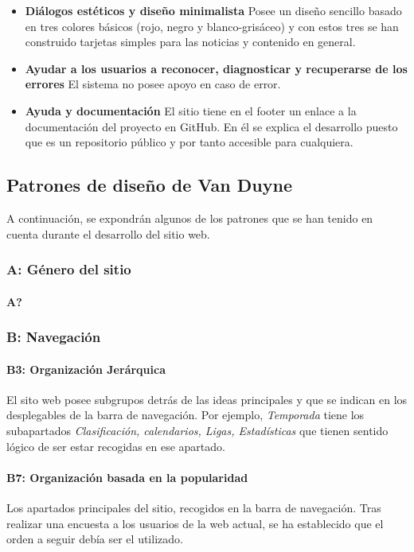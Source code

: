 \documentclass[10pt, spanish, pdftex]{template/UC3M_document}
\begin{document}
\begin{itemize}
    \item \textbf{Diálogos estéticos y diseño minimalista}
    Posee un diseño sencillo basado en tres colores básicos (rojo, negro y blanco-grisáceo) y con estos tres se han construido tarjetas simples para las noticias y contenido en general.

    \item \textbf{Ayudar a los usuarios a reconocer, diagnosticar y recuperarse de los errores}
    El sistema no posee apoyo en caso de error.

    \item \textbf{Ayuda y documentación}
    El sitio tiene en el footer un enlace a la documentación del proyecto en GitHub. En él se explica el desarrollo puesto que es un repositorio público y por tanto accesible para cualquiera.
  \end{itemize}


\subsection{Patrones de diseño de Van Duyne}
A continuación, se expondrán algunos de los patrones que se han tenido en cuenta durante el desarrollo del sitio web.
\subsubsection{A: Género del sitio}
\paragraph{A?}

\subsubsection{B: Navegación}
\paragraph{B3: Organización Jerárquica}
  El sito web posee subgrupos detrás de las ideas principales y que se indican en los desplegables de la barra de navegación. Por ejemplo, \textit{Temporada} tiene los subapartados \textit{Clasificación, calendarios, Ligas, Estadísticas} que tienen sentido lógico de ser estar recogidas en ese apartado.
\paragraph{B7: Organización basada en la popularidad}
  Los apartados principales del sitio, recogidos en la barra de navegación. Tras realizar una encuesta a los usuarios de la web actual, se ha establecido que el orden a seguir debía ser el utilizado.
\end{document}
